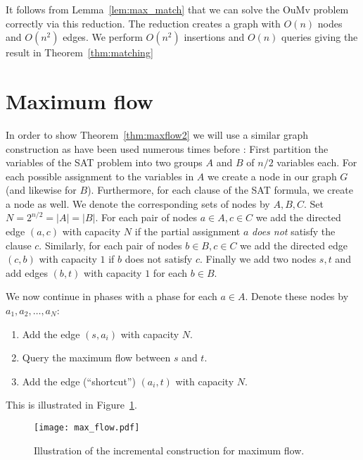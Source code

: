 \documentclass[a4paper,11pt]{article}
\theoremstyle{definition}
\begin{document}
It follows from Lemma~\ref{lem:max_match} that we can solve the OuMv problem
correctly via this reduction. The reduction creates a graph with $O(n)$ nodes
and $O(n^2)$ edges. We perform $O(n^2)$ insertions and $O(n)$ queries giving
the result in Theorem~\ref{thm:matching}


\section{Maximum flow}
In order to show Theorem~\ref{thm:maxflow2} we will use a similar graph
construction as have been used numerous times before
\cite{PatrascuW10,RodittyW13,ChechikLRSTW14,AbboudV14}:
First partition the variables of the SAT problem into two
groups $A$ and $B$ of $n/2$ variables each. For each possible assignment to the variables
in $A$ we create a node in our graph $G$ (and likewise for $B$). Furthermore,
for each clause of the SAT formula, we create a node as well. We denote the
corresponding sets of nodes by $A, B, C$. Set $N = 2^{n/2} = |A| = |B|$. For
each pair of nodes $a\in A, c\in C$ we add the directed edge $(a,c)$ with
capacity $N$ if the partial assignment $a$ \emph{does not} satisfy the clause
$c$. Similarly, for each pair of nodes $b\in B, c\in C$ we add the directed
edge $(c,b)$ with capacity $1$ if $b$ does not satisfy $c$. Finally we add two
nodes $s,t$ and add edges $(b,t)$ with capacity $1$ for each $b\in B$.

We now continue in phases with a phase for each $a\in A$. Denote these nodes
by $a_1,a_2,\ldots,a_N$:
\begin{enumerate}
    \item Add the edge $(s,a_i)$ with capacity $N$.
    \item Query the maximum flow between $s$ and $t$.
    \item Add the edge (``shortcut'') $(a_i,t)$ with capacity $N$.
\end{enumerate}
This is illustrated in Figure~\ref{fig:maxflow}.
\begin{figure}[htbp]
    \centering
    \texttt{[image: max\_flow.pdf]}
    \caption{Illustration of the incremental construction for maximum flow.}
    \label{fig:maxflow}
\end{figure}
\end{document}
